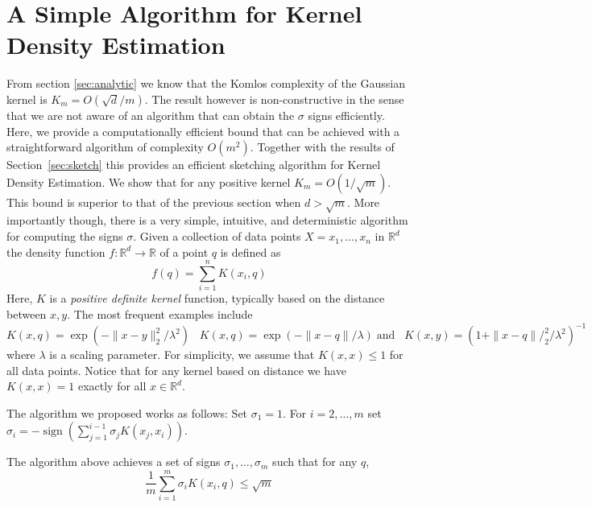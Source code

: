 \documentclass[anon,12pt]{colt2019} %
\newcommand{\R}{\mathbb{R}}
\begin{document}
\section{A Simple Algorithm for Kernel Density Estimation}
From section \ref{sec:analytic} we know that the Komlos complexity of the Gaussian kernel is $K_m = O(\sqrt{d}/m)$. The result however is non-constructive in the sense that we are not aware of an algorithm that can obtain the $\sigma$ signs efficiently. 
Here, we provide a computationally efficient bound that can be achieved with a straightforward algorithm of complexity $O(m^2)$. Together with the results of Section~\ref{sec:sketch} this provides an efficient sketching algorithm for Kernel Density Estimation. We show that for any positive kernel $K_m = O(1/\sqrt{m})$. This bound is superior to that of the previous section when $d > \sqrt{m}$. More importantly though, there is a very simple, intuitive, and deterministic algorithm for computing the signs $\sigma$. 
Given a collection of data points $X = x_1,\ldots, x_n$ in $\R^d$ the density function $f: \R^d \rightarrow \R$ of a point $q$ is defined as 
$$ f(q) = \sum_{i=1}^{n} K(x_i,q) $$
Here, $K$ is a \emph{positive definite kernel} function, typically based on the distance between $x,y$. The most frequent examples include
$$ K(x,q) = \exp(- \|x-y\|_2^2/\lambda^2)\;\;\; K(x,q) = \exp(- \|x-q\|/\lambda) \; \mbox{and}\;\;\; K(x,y) = (1+\|x-q\|/_2^2/\lambda^2)^{-1}$$
where $\lambda$ is a scaling parameter. For simplicity, we assume that $K(x,x) \leq 1$ for all data points. Notice that for any kernel based on distance we have $K(x,x)=1$ exactly for all $x \in \R^d$.

The algorithm we proposed works as follows: Set $\sigma_1 = 1$. For $i=2,\ldots,m$ set $\sigma_i = -\operatorname{sign} (\sum_{j=1}^{i-1}\sigma_j  K(x_j, x_i))$.
\begin{theorem}
The algorithm above achieves a set of signs $\sigma_1,\ldots,\sigma_m$ such that for any $q$,
$$ \frac{1}{m}\sum_{i=1}^m \sigma_i K(x_i,q) \leq \sqrt{m} $$
\end{theorem}
\end{document}

